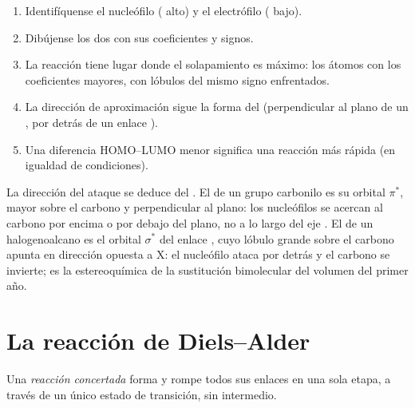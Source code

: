 \begin{method}\label{met:b2:frontier-orbitals:fmo}
\begin{enumerate}
  \item Identifíquense el nucleófilo ( alto) y el electrófilo ( bajo).
  \item Dibújense los dos  con sus coeficientes y signos.
  \item La reacción tiene lugar donde el solapamiento es máximo: los átomos con los
        coeficientes mayores, con lóbulos del mismo signo enfrentados.
  \item La dirección de aproximación sigue la forma del  (perpendicular al plano de un
        , por detrás de un enlace ).
  \item Una diferencia HOMO--LUMO menor significa una reacción más rápida (en igualdad de condiciones).
\end{enumerate}
\end{method}

La dirección del ataque se deduce del . El  de un grupo carbonilo es su orbital
$\pi^*$, mayor sobre el carbono y perpendicular al plano: los nucleófilos se acercan
al carbono por encima o por debajo del plano, no a lo largo del eje . El  de un
halogenoalcano es el orbital $\sigma^*$ del enlace , cuyo lóbulo grande sobre el carbono
apunta en dirección opuesta a X: el nucleófilo ataca por detrás y el carbono se invierte;
es la estereoquímica de la sustitución bimolecular del volumen del primer año.

\section{La reacción de Diels--Alder}

\begin{definition}\label{def:b2:frontier-orbitals:concerted}
Una \emph{reacción concertada} forma y rompe todos sus enlaces en
una sola etapa, a través de un único estado de transición, sin intermedio.
\end{definition}

